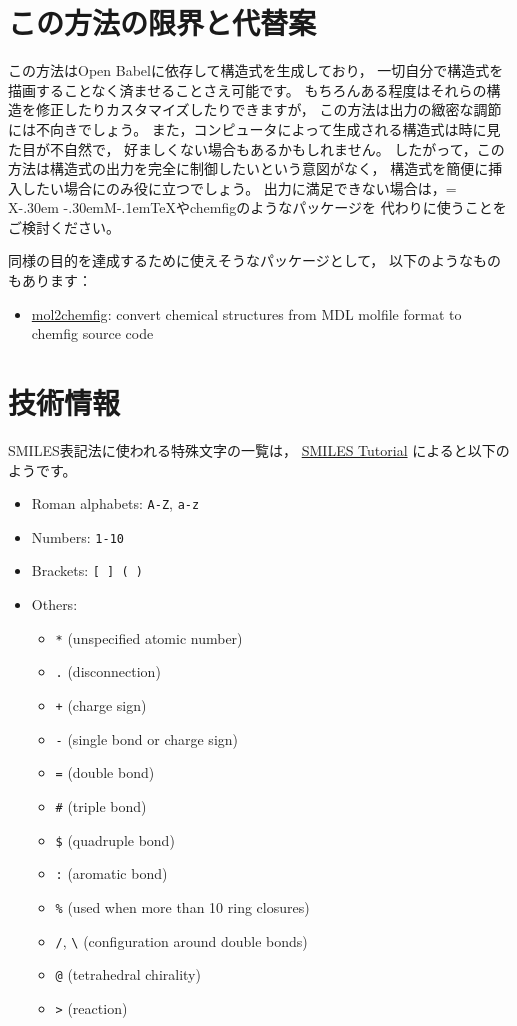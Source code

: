 \documentclass[12pt]{ltjsarticle}
\def\XyM{\ifnum\fam=-1\relax\fam=0\relax\fi\TestCount=\fam
  X\kern-.30em\smash{\raise.50ex\hbox{$\fam\TestCount\Upsilon$}}%
  \kern-.30em{M}}
\def\XyMTeX{\XyM\kern-.1em\TeX}
\def\Lpack#1{\textsf{#1}}
\begin{document}
\clearpage

\section{この方法の限界と代替案}

この方法はOpen Babelに依存して構造式を生成しており，
一切自分で構造式を描画することなく済ませることさえ可能です。
もちろんある程度はそれらの構造を修正したりカスタマイズしたりできますが，
この方法は出力の緻密な調節には不向きでしょう。
また，コンピュータによって生成される構造式は時に見た目が不自然で，
好ましくない場合もあるかもしれません。
したがって，この方法は構造式の出力を完全に制御したいという意図がなく，
構造式を簡便に挿入したい場合にのみ役に立つでしょう。
出力に満足できない場合は，\XyMTeX や\Lpack{chemfig}のようなパッケージを
代わりに使うことをご検討ください。

同様の目的を達成するために使えそうなパッケージとして，
以下のようなものもあります：
\begin{itemize}
  \item \href{http://www.ctan.org/pkg/mol2chemfig}{\Lpack{mol2chemfig}}:
    convert chemical structures from MDL molfile format
    to \Lpack{chemfig} source code
\end{itemize}

\clearpage

\section{技術情報}
\label{detail}

SMILES表記法に使われる特殊文字の一覧は，
\href{http://www.daylight.com/meetings/summerschool98/course/dave/smiles-intro.html}{SMILES Tutorial}%
によると以下のようです。
\begin{itemize}
\item Roman alphabets: \verb|A-Z|, \verb|a-z|
\item Numbers: \verb|1-10|
\item Brackets: \verb|[ ] ( )|
\item Others:
\begin{itemize}
\item \verb|*| (unspecified atomic number)
\item \verb|.| (disconnection)
\item \verb|+| (charge sign)
\item \verb|-| (single bond or charge sign)
\item \verb|=| (double bond)
\item \verb|#| (triple bond)
\item \verb|$| (quadruple bond)
\item \verb|:| (aromatic bond)
\item \verb|%| (used when more than 10 ring closures)
\item \verb|/|, \verb|\| (configuration around double bonds)
\item \verb|@| (tetrahedral chirality)
\item \verb|>| (reaction)
\end{itemize}
\end{itemize}
\end{document}
